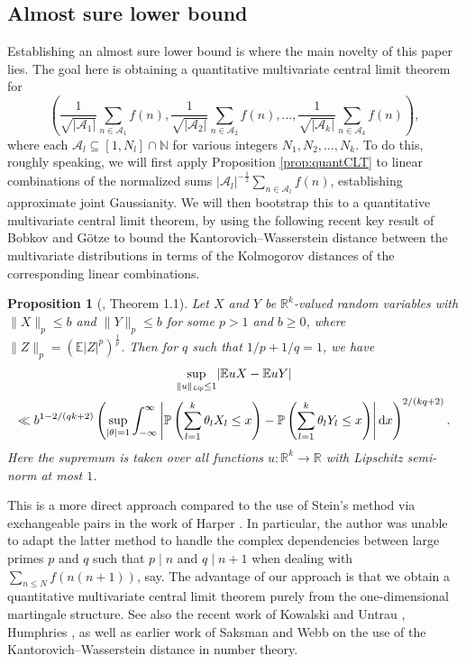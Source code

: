 \documentclass[11pt]{tran-l}
\newtheorem{prop}[theorem]{Proposition}
\theoremstyle{definition}
\theoremstyle{remark}
\numberwithin{equation}{section}
\begin{document}
\subsection{Almost sure lower bound} Establishing an almost sure lower bound is where the main novelty of this paper lies. The goal here is obtaining a quantitative multivariate central limit theorem for 
\begin{equation*}
    \left(\frac{1}{\sqrt{\lvert\mathcal A_1\rvert}}\sum_{n\in\mathcal A_1}f(n), \frac{1}{\sqrt{\lvert\mathcal A_2\rvert}}\sum_{n\in\mathcal A_2}f(n), \ldots, \frac{1}{\sqrt{\lvert\mathcal A_k\rvert}}\sum_{n\in\mathcal A_k}f(n) \right), 
\end{equation*}
where each $\mathcal A_l\subseteq [1, N_l]\cap \mathbb N$ for various integers $N_1, N_2, \ldots, N_k$. To do this, roughly speaking, we will first apply Proposition \ref{prop:quantCLT} to linear combinations of the normalized sums $\lvert\mathcal A_l\rvert^{-\frac{1}{2}}\sum_{n\in\mathcal A_l} f(n)$, establishing approximate joint Gaussianity. We will then bootstrap this to a quantitative multivariate central limit theorem, by using the following recent key result of Bobkov and G\"otze \cite{BobkovGoetze2024} to bound the Kantorovich--Wasserstein distance between the multivariate distributions in terms of the Kolmogorov distances of the corresponding linear combinations. 

\begin{prop}[\cite{BobkovGoetze2024}, Theorem 1.1]\label{prop:multivarCLT} Let $X$ and $Y$ be $\mathbb R^k$-valued random variables with $\|X\|_p\leq b$ and $\|Y\|_p\leq b$ for some $p>1$ and $b\geq 0$, where $\|Z\|_p = \left( \mathbb E\lvert Z\rvert^p\right)^{\frac{1}{p}}$. Then for $q$ such that $1/p + 1/q=1$, we have
\begin{multline*}
    \sup_{\|u\|_{\emph{Lip}}\leq 1} \lvert \mathbb EuX - \mathbb EuY\rvert \\ \ll b^{1-2/(qk+2)} \left(\sup_{\lvert \theta\rvert = 1} \int_{-\infty}^\infty \left\lvert\mathbb P\left(\sum_{l=1}^k \theta_l X_l\leq x \right)- \mathbb P\left(\sum_{l=1}^k \theta_l Y_l\leq x\right)\right\rvert\text{d} x\right)^{2/(kq+2)}. 
\end{multline*} Here the supremum is taken over all functions $u:\mathbb R^k\to\mathbb R$ with Lipschitz semi-norm at most $1$. 
\end{prop}

This is a more direct approach compared to the use of Stein's method via exchangeable pairs in the work of Harper \cite{Harper2013ZetaMax, Harper2023_ASLF}. In particular, the author was unable to adapt the latter method to handle the complex dependencies between large primes $p$ and $q$ such that $p\mid n$ and $q\mid n+1$ when dealing with $\sum_{n\leq N} f(n(n+1))$, say. The advantage of our approach is that we obtain a quantitative multivariate central limit theorem purely from the one-dimensional martingale structure. See also the recent work of Kowalski and Untrau \cite{KowalskiUntrau2025Wasserstein}, Humphries \cite{Humphries2025QuantitativeEquidistribution}, as well as earlier work of Saksman and Webb \cite{saksman2020riemann} on the use of the Kantorovich--Wasserstein distance in number theory. 
\end{document}
